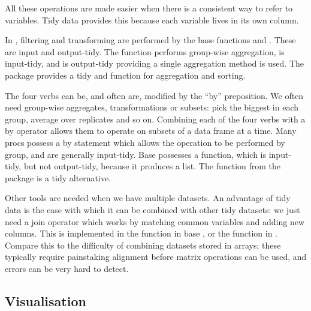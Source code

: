 \documentclass[article]{jss}
\begin{document}
All these operations are made easier when there is a consistent way to refer to variables. Tidy data provides this because each variable lives in its own column.

In , filtering and transforming are performed by the base  functions  and . These are input and output-tidy. The  function performs group-wise aggregation, is input-tidy, and is output-tidy providing a single aggregation method is used. The  package provides a tidy  and  function for aggregation and sorting.

The four verbs can be, and often are, modified by the ``by'' preposition. We often need group-wise aggregates, transformations or subsets: pick the biggest in each group, average over replicates and so on. Combining each of the four verbs with a by operator allows them to operate on subsets of a data frame at a time. Many  {\sc proc}s possess a {\sc by} statement which allows the operation to be performed by group, and are generally input-tidy. Base  possesses a  function, which is input-tidy, but not output-tidy, because it produces a list. The  function from the  package is a tidy alternative.


Other tools are needed when we have multiple datasets. An advantage of tidy data is the ease with which it can be combined with other tidy datasets: we just need a join operator which works by matching common variables and adding new columns. This is implemented in the  function in base , or the  function in . Compare this to the difficulty of combining datasets stored in arrays; these typically require painstaking alignment before matrix operations can be used, and errors can be very hard to detect.

\subsection{Visualisation}
\end{document}
